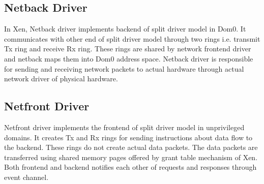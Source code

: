 \subsection{Netback Driver \label{sec:netback}}
In Xen, Netback driver implements backend of split driver model in Dom0. It communicates with other end of split driver model through two rings i.e. transmit Tx ring and receive Rx ring. These rings are shared by network frontend driver and netback maps them into Dom0 address space. Netback driver is responsible for sending and receiving network packets to actual hardware through actual network driver of physical hardware. 

\subsection{Netfront Driver \label{sec:netfront}}
Netfront driver implements the frontend of split driver model in unprivileged domains. It creates Tx and Rx rings for sending instructions about data flow to the backend. These rings do not create actual data packets. The data packets are transferred using shared memory pages offered by grant table mechanism of Xen. Both frontend and backend notifies each other of requests and responses through event channel.

